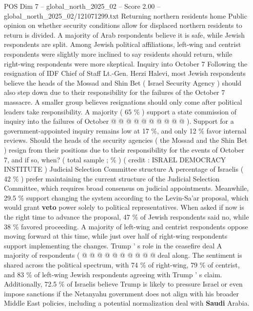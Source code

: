 \begin{textsample}{POS Dim 7 – global\_north\_2025\_02 – Score 2.00 – global\_north\_2025\_02/121071299.txt}
Returning northern residents home Public opinion on whether security conditions allow for displaced northern residents to return is divided.
A majority of Arab respondents believe it is safe, while Jewish respondents are split.
Among Jewish political affiliations, left-wing and centrist respondents were slightly more inclined to say residents should return, while right-wing respondents were more skeptical.
Inquiry into October 7 Following the resignation of IDF Chief of Staff Lt.-Gen.
Herzi Halevi, most Jewish respondents believe the heads of the Mossad and Shin Bet ( Israel Security Agency ) should also step down due to their responsibility for the failures of the October 7 massacre.
A smaller group believes resignations should only come after political leaders take responsibility.
A majority ( 65 \% ) support a state commission of inquiry into the failures of October @ @ @ @ @ @ @ @ @ @ ).
Support for a government-appointed inquiry remains low at 17 \%, and only 12 \% favor internal reviews.
Should the heads of the security agencies ( the Mossad and the Shin Bet ) resign from their positions due to their responsibility for the events of October 7, and if so, when? ( total sample ; \% ) ( credit : ISRAEL DEMOCRACY INSTITUTE ) Judicial Selection Committee structure A percentage of Israelis ( 42 \% ) prefer maintaining the current structure of the Judicial Selection Committee, which requires broad consensus on judicial appointments.
Meanwhile, 29.5 \% support changing the system according to the Levin-Sa'ar proposal, which would grant \textbf{veto} power solely to political representatives.
When asked if now is the right time to advance the proposal, 47 \% of Jewish respondents said no, while 38 \% favored proceeding.
A majority of left-wing and centrist respondents oppose moving forward at this time, while just over half of right-wing respondents support implementing the changes.
Trump ' s role in the ceasefire deal A majority of respondents ( @ @ @ @ @ @ @ @ @ @ deal along.
The sentiment is shared across the political spectrum, with 74 \% of right-wing, 79 \% of centrist, and 83 \% of left-wing Jewish respondents agreeing with Trump ' s claim.
Additionally, 72.5 \% of Israelis believe Trump is likely to pressure Israel or even impose sanctions if the Netanyahu government does not align with his broader Middle East policies, including a potential normalization deal with \textbf{Saudi} Arabia.

\end{textsample}
